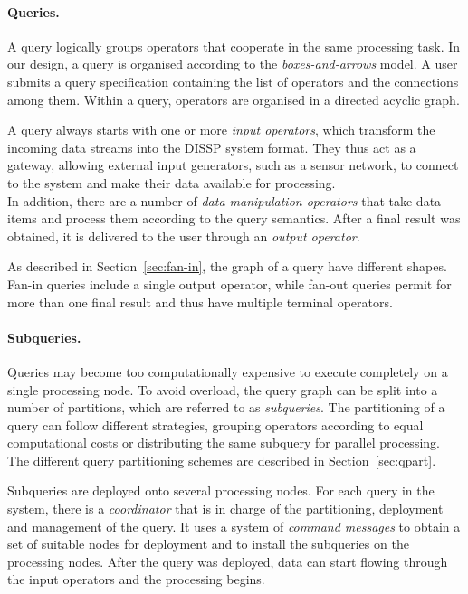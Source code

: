 \paragraph*{Queries.}
\label{sec:queries}

A query logically groups operators that cooperate in the same processing task.
In our design, a query is organised according to the \emph{boxes-and-arrows} model. 
A user submits a query specification containing the list of operators and the connections among them. 
Within a query, operators are organised in a directed acyclic graph. 

A query always starts with one or more \emph{input operators}, which transform the
incoming data streams into the DISSP system format. They thus act as a gateway, allowing external input
generators, such as a sensor network, to connect to the system and make their data available for
processing.\\
In addition, there are a number of \emph{data manipulation operators} that take data items and
process them according to the query semantics. After a final result was obtained, it is delivered to
the user through an \emph{output operator}. 

As described in Section~\ref{sec:fan-in}, the graph of a query have different shapes. Fan-in queries
include a single output operator, while fan-out queries permit for more than one final result and thus
have multiple terminal operators.

\paragraph*{Subqueries.}
Queries may become too computationally expensive to execute completely on a single processing node. 
To avoid overload, the query graph can be split into a number of partitions, which are referred to as
\emph{subqueries}.
The partitioning of a query can follow different strategies, \eg grouping operators according to
equal computational costs or distributing the same subquery for parallel processing. The different query
partitioning schemes are described in Section~\ref{sec:qpart}.

Subqueries are deployed onto several processing nodes. For each query in the system, there is
a \emph{coordinator} that is in charge of the partitioning, deployment and management of the query. It
uses a system of \emph{command messages} to obtain a set of suitable nodes for deployment and to install
the subqueries on the processing nodes. After the query was deployed, data can start flowing
through the input operators and the processing begins.
